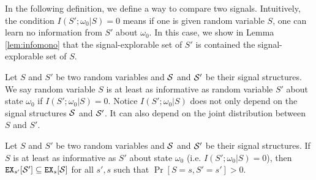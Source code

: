In the following definition, we define a way to compare two signals. Intuitively, the condition $I(S';\omega_0|S)= 0$  means if one is given random variable $S$, one can learn no information from $S'$ about $\omega_0$. In this case, we show in Lemma \ref{lem:infomono} that the signal-explorable set of $S'$ is contained the signal-explorable set of $S$.
\begin{definition}
Let $S$ and $S'$ be two random variables and $\S$ and $\S'$ be their signal structures. We say random variable $S$ is at least as informative as random variable $S'$ about state $\omega_0$ if $I(S' ; \omega_0|S) = 0$. Notice $I(S';\omega_0|S)$ does not only depend on the signal structures $\S$ and $\S'$. It can also depend on the joint distribution between $S$ and $S'$.
\end{definition}

\begin{lemma}
\label{lem:infomono}
Let $S$ and $S'$ be two random variables and $\S$ and $\S'$ be their signal structures. If $S$ is at least as informative as $S'$ about state $\omega_0$ (i.e. $I(S' ; \omega_0|S) = 0$), then $\EX_{s'}[\S'] \subseteq \EX_s[\S]$ for all $s' ,s$ such that $\Pr[S= s, S'= s'] > 0$.
\end{lemma}

